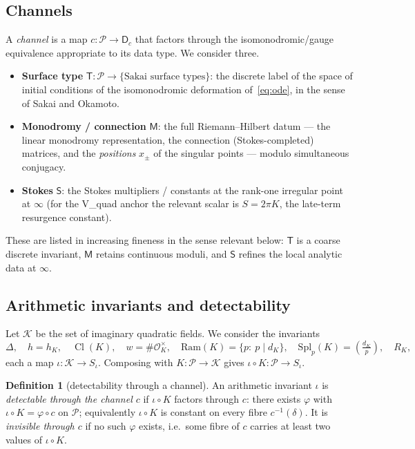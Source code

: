 \documentclass[11pt]{article}
\theoremstyle{definition}
\newtheorem{definition}[theorem]{Definition}
\newcommand{\Cl}{\operatorname{Cl}}
\newcommand{\Kr}[2]{\left(\tfrac{#1}{#2}\right)}
\newcommand{\Dc}{\mathsf{D}}
\newcommand{\Tch}{\mathsf{T}}
\newcommand{\Mch}{\mathsf{M}}
\newcommand{\Stch}{\mathsf{S}}
\begin{document}
\subsection{Channels}
A \emph{channel} is a map $c\colon\mathcal P\to \Dc_c$ that factors through the
isomonodromic/gauge equivalence appropriate to its data type. We consider three.
\begin{itemize}[leftmargin=2em]
\item \textbf{Surface type} $\Tch\colon\mathcal P\to\{\text{Sakai surface types}\}$:
the discrete label of the space of initial conditions of the isomonodromic
deformation of~\eqref{eq:ode}, in the sense of Sakai \cite{Sakai2001} and Okamoto.
\item \textbf{Monodromy / connection} $\Mch$: the full Riemann--Hilbert datum --- the
linear monodromy representation, the connection (Stokes-completed) matrices, and the
\emph{positions} $x_\pm$ of the singular points --- modulo simultaneous conjugacy.
\item \textbf{Stokes} $\Stch$: the Stokes multipliers / constants at the rank-one
irregular point at $\infty$ (for the V\_quad anchor the relevant scalar is
$S=2\pi K$, the late-term resurgence constant).
\end{itemize}
These are listed in increasing fineness in the sense relevant below: $\Tch$ is a
coarse discrete invariant, $\Mch$ retains continuous moduli, and $\Stch$ refines the
local analytic data at $\infty$.

\subsection{Arithmetic invariants and detectability}
Let $\mathcal K$ be the set of imaginary quadratic fields. We consider the invariants
\[
  \Delta,\quad h=h_K,\quad \Cl(K),\quad w=\#\mathcal O_K^\times,\quad
  \mathrm{Ram}(K)=\{p:\ p\mid d_K\},\quad
  \mathrm{Spl}_p(K)=\Kr{d_K}{p},\quad R_K,
\]
each a map $\iota\colon\mathcal K\to S_\iota$. Composing with $K\colon\mathcal P\to
\mathcal K$ gives $\iota\circ K\colon\mathcal P\to S_\iota$.

\begin{definition}[detectability through a channel]\label{def:detect}
An arithmetic invariant $\iota$ is \emph{detectable through the channel $c$} if
$\iota\circ K$ factors through $c$: there exists $\varphi$ with
$\iota\circ K=\varphi\circ c$ on $\mathcal P$; equivalently $\iota\circ K$ is constant
on every fibre $c^{-1}(\delta)$. It is \emph{invisible through $c$} if no such
$\varphi$ exists, i.e.\ some fibre of $c$ carries at least two values of $\iota\circ K$.
\end{definition}
\end{document}
